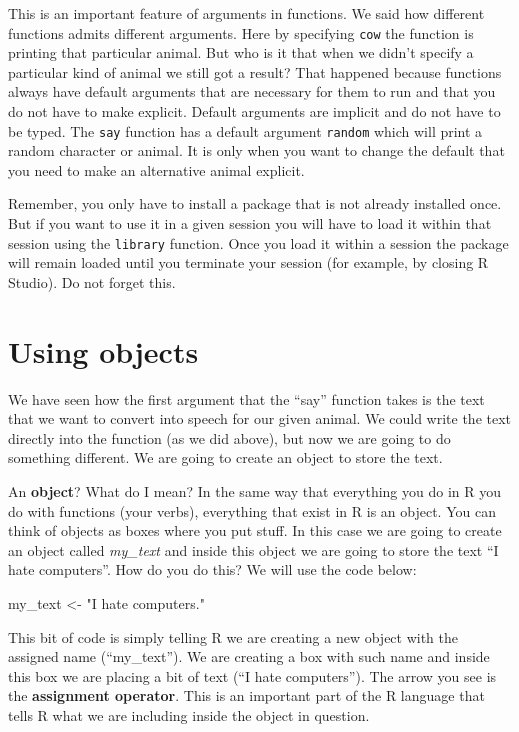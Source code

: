 \documentclass[
]{book}
\newenvironment{Shaded}{\begin{snugshade}}{\end{snugshade}}
\newcommand{\NormalTok}[1]{#1}
\newcommand{\OtherTok}[1]{\textcolor[rgb]{0.56,0.35,0.01}{#1}}
\newcommand{\StringTok}[1]{\textcolor[rgb]{0.31,0.60,0.02}{#1}}
\begin{document}
This is an important feature of arguments in functions. We said how different functions admits different arguments. Here by specifying \texttt{cow} the function is printing that particular animal. But who is it that when we didn't specify a particular kind of animal we still got a result? That happened because functions always have default arguments that are necessary for them to run and that you do not have to make explicit. Default arguments are implicit and do not have to be typed. The \texttt{say} function has a default argument \texttt{random} which will print a random character or animal. It is only when you want to change the default that you need to make an alternative animal explicit.

Remember, you only have to install a package that is not already installed once. But if you want to use it in a given session you will have to load it within that session using the \texttt{library} function. Once you load it within a session the package will remain loaded until you terminate your session (for example, by closing R Studio). Do not forget this.

\hypertarget{using-objects}{%
\section{Using objects}\label{using-objects}}

We have seen how the first argument that the ``say'' function takes is the text that we want to convert into speech for our given animal. We could write the text directly into the function (as we did above), but now we are going to do something different. We are going to create an object to store the text.

An \textbf{object}? What do I mean? In the same way that everything you do in R you do with functions (your verbs), everything that exist in R is an object. You can think of objects as boxes where you put stuff. In this case we are going to create an object called \emph{my\_text} and inside this object we are going to store the text ``I hate computers''. How do you do this? We will use the code below:

\begin{Shaded}
\begin{Highlighting}[]
\NormalTok{my\_text }\OtherTok{\textless{}{-}} \StringTok{"I hate computers."}
\end{Highlighting}
\end{Shaded}

This bit of code is simply telling R we are creating a new object with the assigned name (``my\_text''). We are creating a box with such name and inside this box we are placing a bit of text (``I hate computers''). The arrow you see is the \textbf{assignment operator}. This is an important part of the R language that tells R what we are including inside the object in question.
\end{document}
